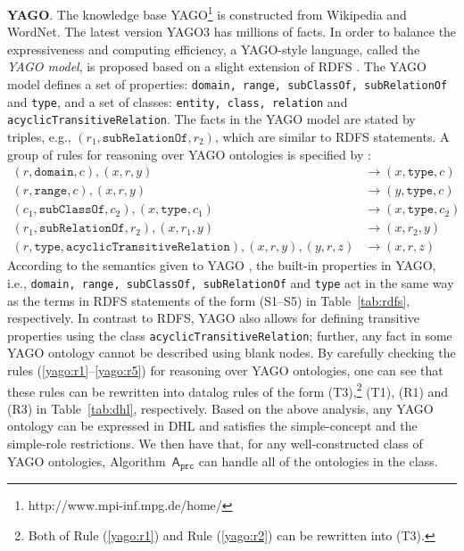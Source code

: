 \textbf{YAGO}. The knowledge base YAGO\footnote{http://www.mpi-inf.mpg.de/home/}
is constructed from Wikipedia and WordNet. The latest version
YAGO3 \cite{MahdisoltaniBS15} has millions of facts.
In order to balance the expressiveness and computing efficiency,
a YAGO-style language, called the \emph{YAGO model}, is proposed based on
a slight extension of RDFS \cite{SuchanekKW08}. The YAGO model defines
a set of properties: \texttt{domain, range, subClassOf, subRelationOf} and \texttt{type},
and a set of classes: \texttt{entity, class, relation} and \texttt{acyclicTransitiveRelation}.
The facts in the YAGO model are stated by triples, e.g., $(r_1,
\texttt{subRelationOf}, r_2)$,
which are similar to RDFS statements.
A group of rules for reasoning over YAGO ontologies
is specified by \citet{SuchanekKW08}:
\begin{align}
(r,\texttt{domain}, c), (x, r, y) & \rightarrow (x,
    \texttt{type}, c)\label{yago:r1}\\
(r,\texttt{range}, c), (x, r, y) & \rightarrow (y,
    \texttt{type}, c)\label{yago:r2}\\
(c_1, \texttt{subClassOf}, c_2), (x, \texttt{type}, c_1)
    & \rightarrow (x, \texttt{type}, c_2)\label{yago:r3}\\
(r_1, \texttt{subRelationOf}, r_2), (x, r_1, y) & \rightarrow
    (x, r_2, y)\label{yago:r4}\\
(r, \texttt{type}, \texttt{acyclicTransitiveRelation}), (x,
    r, y), (y, r, z) & \rightarrow (x, r, z)\label{yago:r5}
\end{align}
According to the semantics given to YAGO \cite{SuchanekKW08}, the built-in properties in YAGO,
i.e., \texttt{domain, range, subClassOf, subRelationOf} and \texttt{type} act in the same
way as the terms in RDFS statements of the form (S1--S5) in Table~\ref{tab:rdfs}, respectively.
In contrast to RDFS, YAGO also allows for defining
transitive properties using the
class \texttt{acyclicTransitiveRelation}; further, any fact in some YAGO ontology cannot be
described using blank nodes. By carefully checking the rules (\ref{yago:r1}--\ref{yago:r5}) for reasoning over YAGO ontologies,
one can see that these rules can be rewritten into datalog rules
of the form (T3),\footnote{Both of Rule (\ref{yago:r1}) and
Rule (\ref{yago:r2}) can be rewritten into (T3).} (T1), (R1) and (R3) in Table~\ref{tab:dhl}, respectively.
Based on the above analysis, any YAGO ontology can be expressed in DHL
and satisfies the simple-concept and the simple-role restrictions. We then have that,
for any well-constructed class of YAGO ontologies,
Algorithm~$\mathsf{A}_{\texttt{prc}}$
can handle all of the ontologies in the class.

